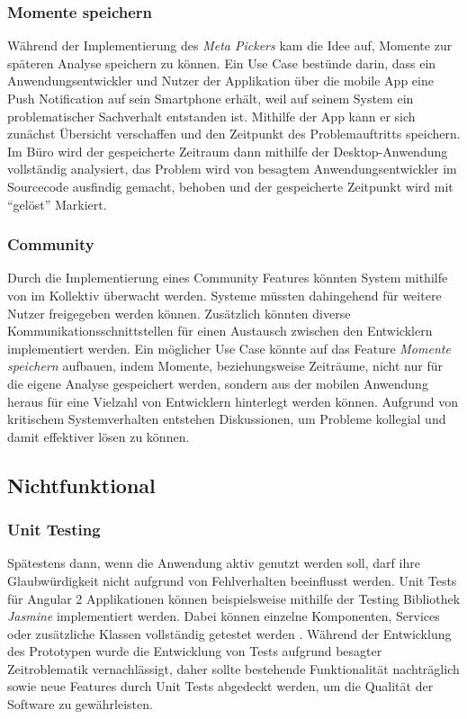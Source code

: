 \subsubsection{Momente speichern}

Während der Implementierung des \emph{Meta Pickers} kam die Idee auf, Momente zur späteren Analyse speichern zu können.
Ein Use Case bestünde darin, dass ein Anwendungsentwickler und Nutzer der Applikation \projectname{}
über die mobile App eine Push Notification auf sein Smartphone erhält, weil auf seinem System ein problematischer Sachverhalt
entstanden ist. Mithilfe der App kann er sich zunächst Übersicht verschaffen und den Zeitpunkt des Problemauftritts speichern.
Im Büro wird der gespeicherte Zeitraum dann mithilfe der Desktop-Anwendung vollständig analysiert,
das Problem wird von besagtem Anwendungsentwickler im Sourcecode ausfindig gemacht, behoben und der gespeicherte Zeitpunkt wird mit ``gelöst'' Markiert.

\subsubsection{Community}

Durch die Implementierung eines Community Features könnten System mithilfe von \projectname{} im Kollektiv überwacht werden.
Systeme müssten dahingehend für weitere Nutzer freigegeben werden können.
Zusätzlich könnten diverse Kommunikationsschnittstellen für einen
Austausch zwischen den Entwicklern implementiert werden. Ein möglicher Use Case könnte auf das Feature
\emph{Momente speichern} aufbauen,
indem Momente, beziehungsweise Zeiträume, nicht nur für die eigene Analyse gespeichert werden, sondern aus der mobilen Anwendung heraus
für eine Vielzahl von Entwicklern hinterlegt werden können.
Aufgrund von kritischem Systemverhalten entstehen Diskussionen, um Probleme kollegial und damit effektiver lösen zu können.

\subsection{Nichtfunktional}


\subsubsection{Unit Testing}

Spätestens dann, wenn die Anwendung aktiv genutzt werden soll, darf ihre Glaubwürdigkeit nicht aufgrund von Fehlverhalten beeinflusst werden.
Unit Tests für Angular 2 Applikationen können beispielsweise mithilfe der Testing Bibliothek \emph{Jasmine} implementiert werden.
Dabei können einzelne Komponenten, Services oder zusätzliche Klassen vollständig getestet werden \cite{Angul78:online}.
Während der Entwicklung des Prototypen \projectname{} wurde die Entwicklung von Tests aufgrund besagter Zeitroblematik vernachlässigt,
daher sollte bestehende Funktionalität nachträglich sowie neue Features durch Unit Tests abgedeckt werden, um die Qualität der Software zu gewährleisten.

